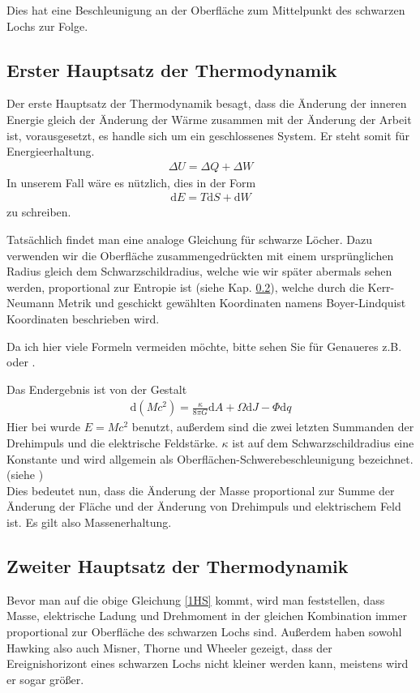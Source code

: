 \documentclass[ngerman]{scrartcl}
\newcommand{\diff}{\mathrm{d}}
\begin{document}
	Dies hat eine Beschleunigung an der Oberfläche zum Mittelpunkt des schwarzen Lochs zur Folge. 

	\subsection{Erster Hauptsatz der Thermodynamik}
	Der erste Hauptsatz der Thermodynamik besagt, dass die Änderung der inneren Energie gleich der Änderung der Wärme zusammen mit der Änderung der Arbeit ist, vorausgesetzt, es handle sich um ein geschlossenes System. Er steht somit für Energieerhaltung.
		\begin{align}
			\Delta U = \Delta Q + \Delta W
		\end{align}
	In unserem Fall wäre es nützlich, dies in der Form
		\begin{align}
			\diff E = T\diff S + \diff W
		\end{align}
	zu schreiben. 
	
	Tatsächlich findet man eine analoge Gleichung für schwarze Löcher.
	Dazu verwenden wir die Oberfläche zusammengedrückten mit einem ursprünglichen Radius gleich dem Schwarzschildradius, welche wie wir später abermals sehen werden, proportional zur Entropie ist (siehe Kap. \ref{zweiterHS}), welche durch die Kerr-Neumann Metrik und geschickt gewählten Koordinaten namens Boyer-Lindquist Koordinaten beschrieben wird. 
	
	Da ich hier viele Formeln vermeiden möchte, bitte sehen Sie für Genaueres z.B. \cite{BekensteinHawking} oder \cite{Gebhardt}.
	
	Das Endergebnis ist von der Gestalt
		\begin{align} \label{1HS}
			\diff (Mc^2) = \frac{\kappa}{8 \pi G} \diff A + \Omega \diff J - \Phi \diff q
		\end{align} 
	Hier bei wurde $E = Mc^2$ benutzt, außerdem sind die zwei letzten Summanden der Drehimpuls und die elektrische Feldstärke. $\kappa$ ist auf dem Schwarzschildradius eine Konstante und wird allgemein als Oberflächen-Schwerebeschleunigung bezeichnet. (siehe \cite{Gebhardt})
	\\
	
	Dies bedeutet nun, dass die Änderung der Masse proportional zur Summe der Änderung der Fläche und der Änderung von Drehimpuls und elektrischem Feld ist. Es gilt also Massenerhaltung. 

\subsection{Zweiter Hauptsatz der Thermodynamik} \label{zweiterHS}
	Bevor man auf die obige Gleichung \ref{1HS} kommt, wird man feststellen, dass Masse, elektrische Ladung und Drehmoment in der gleichen Kombination immer proportional zur Oberfläche des schwarzen Lochs sind. 
	Außerdem haben sowohl Hawking \cite{ParticleCreation} also auch Misner, Thorne und Wheeler \cite{MisnerThorneWheeler} gezeigt, dass der Ereignishorizont eines schwarzen Lochs nicht kleiner werden kann, meistens wird er sogar größer. 
	
\end{document}
